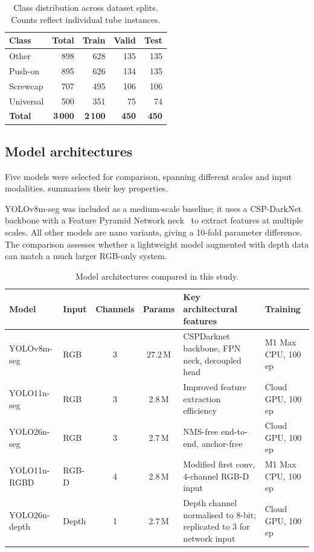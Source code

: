 \documentclass{Academic}
\begin{document}
\begin{table}[!htbp]
  \centering
  \begin{tabular}{lrrrr}
    \toprule
    \textbf{Class} & \textbf{Total} & \textbf{Train} & \textbf{Valid} & \textbf{Test} \\
    \midrule
    Other      & 898  & 628  & 135 & 135 \\
    Push-on    & 895  & 626  & 134 & 135 \\
    Screwcap   & 707  & 495  & 106 & 106 \\
    Universal  & 500  & 351  &  75 &  74 \\
    \midrule
    \textbf{Total} & \textbf{3\,000} & \textbf{2\,100} & \textbf{450} & \textbf{450} \\
    \bottomrule
  \end{tabular}
  \caption{Class distribution across dataset splits. Counts reflect individual tube instances.}
  \label{tab:class_dist}
\end{table}

\subsection{Model architectures}

Five models were selected for comparison, spanning different scales and input modalities.  summarises their key properties.

YOLOv8m-seg was included as a medium-scale baseline; it uses a CSP-DarkNet backbone with a Feature Pyramid Network neck~\supercite{lin2017fpn} to extract features at multiple scales. All other models are nano variants, giving a 10-fold parameter difference. The comparison assesses whether a lightweight model augmented with depth data can match a much larger RGB-only system.

\begin{table}[!htbp]
  \centering\small
  \setlength{\tabcolsep}{4pt}
  \begin{tabular}{llccp{5.0cm}p{2.8cm}}
    \toprule
    \textbf{Model} & \textbf{Input} & \textbf{Channels} & \textbf{Params} & \textbf{Key architectural features} & \textbf{Training} \\
    \midrule
    YOLOv8m-seg   & RGB   & 3 & 27.2\,M & CSPDarknet backbone, FPN neck, decoupled head & M1 Max CPU, 100\,ep \\
    YOLO11n-seg   & RGB   & 3 & 2.8\,M  & Improved feature extraction efficiency        & Cloud GPU, 100\,ep \\
    YOLO26n-seg   & RGB   & 3 & 2.7\,M  & NMS-free end-to-end, anchor-free              & Cloud GPU, 100\,ep \\
    YOLO11n-RGBD  & RGB-D  & 4 & 2.8\,M  & Modified first conv, 4-channel RGB-D input    & M1 Max CPU, 100\,ep \\
    YOLO26n-depth & Depth & 1 & 2.7\,M  & Depth channel normalised to 8-bit; replicated to 3 for network input & Cloud GPU, 100\,ep \\
    \bottomrule
  \end{tabular}
  \caption{Model architectures compared in this study.}
  \label{tab:architectures}
\end{table}
\end{document}
